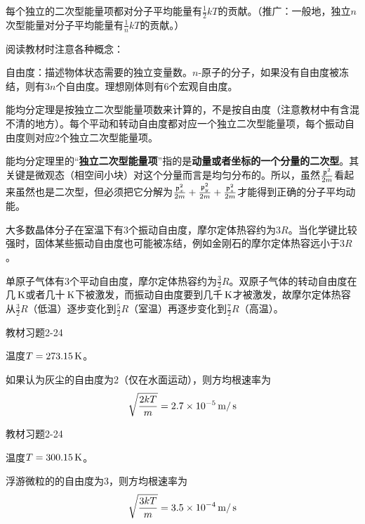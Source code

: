 \documentclass[CJK]{beamer}
\begin{document}
\begin{frame}
\bch
{\scriptsize
{\blue 每个独立的二次型能量项都对分子平均能量有$\frac{1}{2}kT$的贡献。（推广：一般地，独立$n$次型能量对分子平均能量有$\frac{1}{n}kT$的贡献。）}

阅读教材时注意各种概念：
\bitem
\item{自由度：描述物体状态需要的独立变量数。$n$-原子的分子，如果没有自由度被冻结，则有$3n$个自由度。理想刚体则有6个宏观自由度。}
\item{能均分定理是按独立二次型能量项数来计算的，不是按自由度（注意教材中有含混不清的地方）。每个平动和转动自由度都对应一个独立二次型能量项，每个振动自由度则对应2个独立二次型能量项。}
\item{能均分定理里的“{\bf 独立二次型能量项}”指的是{\bf 动量或者坐标的一个分量的二次型}。其关键是微观态（相空间小块）对这个分量而言是均匀分布的。所以，虽然$\frac{{\mathfrak{p}}^2}{2m}$看起来虽然也是二次型，但必须把它分解为$\frac{{\mathfrak{p}}_x^2}{2m}+\frac{{\mathfrak{p}}_y^2}{2m}+\frac{{\mathfrak{p}}_z^2}{2m}$才能得到正确的分子平均动能。}
\item{大多数晶体分子在室温下有3个振动自由度，摩尔定体热容约为$3R$。当化学键比较强时，固体某些振动自由度也可能被冻结，例如金刚石的摩尔定体热容远小于$3R$。}
\item{单原子气体有3个平动自由度，摩尔定体热容约为$\frac{3}{2}R$。双原子气体的转动自由度在几$\,\mathrm{K}$或者几十$\,\mathrm{K}$下被激发，而振动自由度要到几千$\,\mathrm{K}$才被激发，故摩尔定体热容从$\frac{3}{2}R$（低温）逐步变化到$\frac{5}{2}R$（室温）再逐步变化到$\frac{7}{2}R$（高温）。}
\eitem
}
\ech
\end{frame}

\begin{frame}
\bch
{\blue 教材习题2-24}

\skipline

{\small
温度$T = 273.15\,\mathrm{K}$。

如果认为灰尘的自由度为2（仅在水面运动），则方均根速率为
$$\sqrt{\frac{2kT}{m}} = 2.7\times 10^{-5} \,\mathrm{m}/\,\mathrm{s}$$  
}

\ech
\end{frame}


\begin{frame}
\bch
{\blue 教材习题2-24}

\skipline

{\small
温度$T = 300.15\,\mathrm{K}$。

浮游微粒的的自由度为3，则方均根速率为
$$\sqrt{\frac{3kT}{m}} = 3.5\times 10^{-4} \,\mathrm{m}/\,\mathrm{s}$$  
}

\ech
\end{frame}
\end{document}
